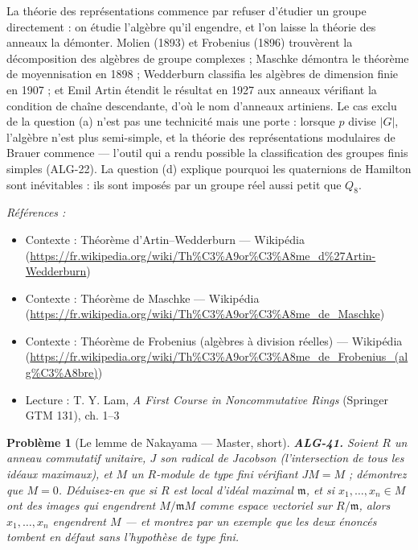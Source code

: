 \documentclass[11pt]{article}
\newtheorem{problem}{Problème}
\newenvironment{refs}{\par\small\noindent\emph{Références :}\begin{itemize}\setlength\itemsep{0pt}}{\end{itemize}\normalsize}
\begin{document}
\noindent La théorie des représentations commence par refuser d'étudier un groupe directement : on
étudie l'algèbre qu'il engendre, et l'on laisse la théorie des anneaux la démonter. Molien (1893) et
Frobenius (1896) trouvèrent la décomposition des algèbres de groupe complexes ; Maschke démontra le théorème
de moyennisation en 1898 ; Wedderburn classifia les algèbres de dimension finie en 1907 ; et Emil Artin
étendit le résultat en 1927 aux anneaux vérifiant la condition de chaîne descendante, d'où le nom d'anneaux
artiniens. Le cas exclu de la question (a) n'est pas une technicité mais une porte : lorsque $p$ divise
$|G|$, l'algèbre n'est plus semi-simple, et la théorie des représentations modulaires de Brauer commence ---
l'outil qui a rendu possible la classification des groupes finis simples (ALG-22). La question (d) explique
pourquoi les quaternions de Hamilton sont inévitables : ils sont imposés par un groupe réel aussi petit que
$Q_8$.

\begin{refs}
\item Contexte : Théorème d'Artin--Wedderburn --- Wikipédia (\url{https://fr.wikipedia.org/wiki/Th%C3%A9or%C3%A8me_d%27Artin-Wedderburn})
\item Contexte : Théorème de Maschke --- Wikipédia (\url{https://fr.wikipedia.org/wiki/Th%C3%A9or%C3%A8me_de_Maschke})
\item Contexte : Théorème de Frobenius (algèbres à division réelles) --- Wikipédia (\url{https://fr.wikipedia.org/wiki/Th%C3%A9or%C3%A8me_de_Frobenius_(alg%C3%A8bre)})
\item Lecture : T. Y. Lam, \textit{A First Course in Noncommutative Rings} (Springer GTM 131), ch. 1--3
\end{refs}

\bigskip

\begin{problem}[{Le lemme de Nakayama --- Master, short}]
\textbf{ALG-41.} Soient $R$ un anneau commutatif unitaire, $J$ son
radical de Jacobson (l'intersection de tous les idéaux maximaux), et $M$ un $R$-module de type
fini vérifiant $JM = M$ ; démontrez que $M = 0$. Déduisez-en que si $R$ est local d'idéal
maximal $\mathfrak{m}$, et si $x_1, \dots, x_n \in M$ ont des images qui engendrent
$M/\mathfrak{m}M$ comme espace vectoriel sur $R/\mathfrak{m}$, alors $x_1, \dots, x_n$ engendrent
$M$ --- et montrez par un exemple que les deux énoncés tombent en défaut sans l'hypothèse de type fini.
\end{problem}
\end{document}

